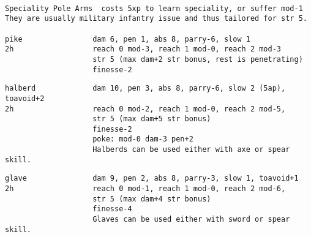 \

\goodbreak \small \begin{samepage} \begin{verbatim}
Speciality Pole Arms  costs 5xp to learn speciality, or suffer mod-1
They are usually military infantry issue and thus tailored for str 5.

pike                dam 6, pen 1, abs 8, parry-6, slow 1
2h                  reach 0 mod-3, reach 1 mod-0, reach 2 mod-3
                    str 5 (max dam+2 str bonus, rest is penetrating)
                    finesse-2
\end{verbatim} \blocklistgap \begin{verbatim}
halberd             dam 10, pen 3, abs 8, parry-6, slow 2 (5ap), toavoid+2
2h                  reach 0 mod-2, reach 1 mod-0, reach 2 mod-5,
                    str 5 (max dam+5 str bonus)
                    finesse-2
                    poke: mod-0 dam-3 pen+2
                    Halberds can be used either with axe or spear skill.
\end{verbatim} \blocklistgap \begin{verbatim}
glave               dam 9, pen 2, abs 8, parry-3, slow 1, toavoid+1
2h                  reach 0 mod-1, reach 1 mod-0, reach 2 mod-6,
                    str 5 (max dam+4 str bonus)
                    finesse-4
                    Glaves can be used either with sword or spear skill.
\end{verbatim} \end{samepage} \normalsize \goodbreak

\

